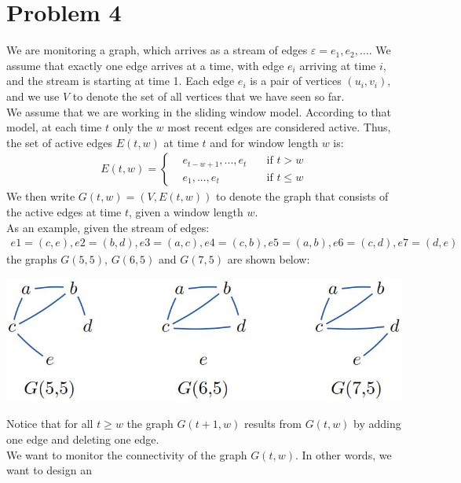 
\section{Problem 4}

We are monitoring a graph, which arrives as a stream of edges $\varepsilon= e_1, e_2, \ldots$. We
assume that exactly one edge arrives at a time, with edge $e_{i}$ arriving at time $i$, and the stream is starting at time 1. Each edge $e_{i}$ is a pair of vertices $(u_{i},v_{i})$, and we use $V$ to denote the set of all vertices that we have seen so far.\\
We assume that we are working in the sliding window model. According to that model, at each
time $t$ only the $w$ most recent edges are considered active. Thus, the set of active edges $E(t,w)$ at time $t$ and for window length $w$ is:
\begin{align*}
E(t,w) = 
	\left\{ \begin{aligned}
		&e_{t-w+1}, . . . ,e_t &\quad\text{if }t > w\\
		&e_1, . . . ,e_t &\quad\text{if }t \le  w
	\end{aligned}\right.
\end{align*}
We then write $G(t,w) = (V,E(t,w))$ to denote the graph that consists of the active edges at time $t$, given a window length $w$.\\
As an example, given the stream of edges:
\begin{align*}
	e1 = (c,e), e2 = (b,d), e3 = (a,c), e4 = (c,b), e5 = (a,b), e6 = (c,d), e7 = (d,e)
\end{align*}
the graphs $G(5,5)$, $G(6,5)$ and $G(7,5)$ are shown below:
\begin{center}
	\includegraphics[scale=0.5]{img/example_graphs.jpg}
\end{center}
Notice that for all $t \ge w$ the graph $G(t+1,w)$ results from $G(t,w)$ by adding one edge and deleting one edge.\\
We want to monitor the connectivity of the graph $G(t,w)$. In other words, we want to design an
